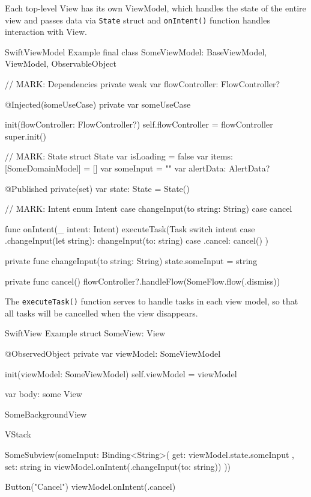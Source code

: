 \documentclass[
  biblatex,
  language=english,
  figures=false,
  sourcecodes,
  glossaries,
  index
]{kidiplom}
\begin{document}
Each top-level View has its own ViewModel, which handles the state of the entire view and passes data via \texttt{State} struct and \texttt{onIntent()} function handles interaction with View.

\begin{kicode}{Swift}{}{ViewModel Example}
final class SomeViewModel: BaseViewModel, ViewModel, ObservableObject {

    // MARK: Dependencies
    private weak var flowController: FlowController?

    @Injected(\.someUseCase) private var someUseCase

    init(flowController: FlowController?) {
        self.flowController = flowController
        super.init()
    }

    // MARK: State
    struct State {
        var isLoading = false
        var items: [SomeDomainModel] = []
        var someInput = ""
        var alertData: AlertData?
    }

    @Published private(set) var state: State = State()

    // MARK: Intent
    enum Intent {
        case changeInput(to string: String)
        case cancel
    }

    func onIntent(_ intent: Intent)  {
        executeTask(Task {
            switch intent {
            case .changeInput(let string): changeInput(to: string)
            case .cancel: cancel()
            }
        })
    }

    private func changeInput(to string: String) {
        state.someInput = string
    }

    private func cancel() {
        flowController?.handleFlow(SomeFlow.flow(.dismiss))
    }
}
\end{kicode}

The \texttt{executeTask()} function serves to handle tasks in each view model, so that all tasks will be cancelled when the view disappears.

\begin{kicode}{Swift}{}{View Example}
struct SomeView: View {

    @ObservedObject private var viewModel: SomeViewModel

    init(viewModel: SomeViewModel) {
        self.viewModel = viewModel
    }

    var body: some View {
        SomeBackgroundView {
            VStack {
                SomeSubview(someInput: Binding<String>(
                    get: { viewModel.state.someInput },
                    set: { string in viewModel.onIntent(.changeInput(to: string)) }
                ))

                Button("Cancel") {
                    viewModel.onIntent(.cancel)
                }
            }
        }
    }
}
\end{kicode}
\end{document}
